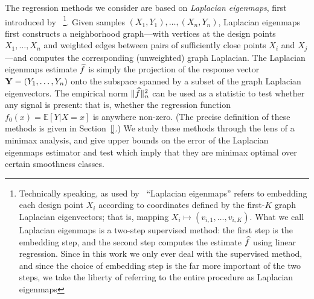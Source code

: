 The regression methods we consider are based on \emph{Laplacian eigenmaps}, first introduced by~\cite{belkin03a} \footnote{Technically speaking, as used by~\cite{belkin03a} ``Laplacian eigenmaps'' refers to embedding each design point $X_i$ according to coordinates defined by the first-$K$ graph Laplacian eigenvectors; that is, mapping $X_i \mapsto (v_{i,1},\ldots,v_{i,K})$. What we call Laplacian eigenmaps is a two-step supervised method: the first step is the embedding step, and the second step computes the estimate $\widehat{f}$ using linear regression.  Since in this work we only ever deal with the supervised method, and since the choice of embedding step is the far more important of the two steps, we take the liberty of referring to the entire procedure as Laplacian eigenmaps}. Given samples $(X_1,Y_1),\ldots,(X_n,Y_n)$, Laplacian eigenmaps first constructs a neighborhood graph---with vertices at the design points $X_1,\ldots,X_n$ and weighted edges between pairs of sufficiently close points $X_i$ and $X_j$---and computes the corresponding (unweighted) graph Laplacian. The Laplacian eigenmaps estimate $\widehat{f}$ is simply the projection of the response vector ${\bf Y} = (Y_1,\ldots,Y_n)$ onto the subspace spanned by a subset of the graph Laplacian eigenvectors. The empirical norm $\|\widehat{f}\|_n^2$ can be used as a statistic to test whether any signal is present: that is, whether the regression function $f_0(x) = \mathbb{E}[Y|X = x]$ is anywhere non-zero. (The precise definition of these methods is given in Section~\ref{}.) We study these methods through the lens of a minimax analysis, and give upper bounds on the error of the Laplacian eigenmaps estimator and test which imply that they are minimax optimal over certain smoothness classes.


